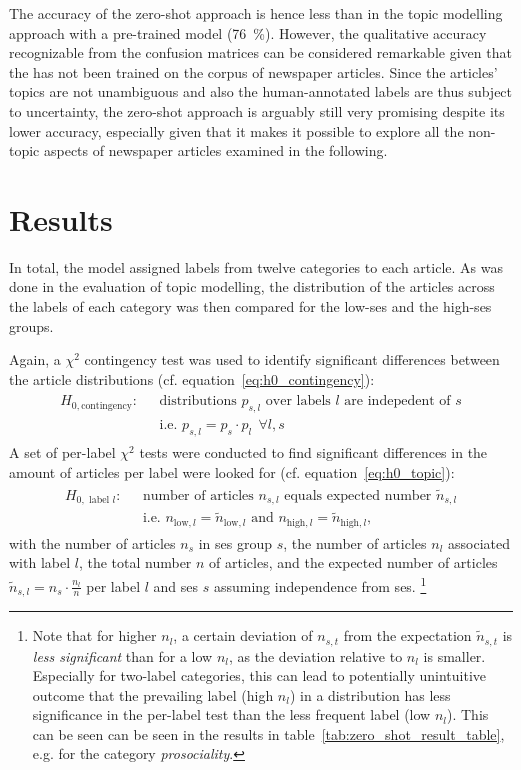 The accuracy of the zero-shot approach is hence less than in the topic modelling approach with a pre-trained model (\SI{76}{\percent}). However, the qualitative accuracy recognizable from the confusion matrices can be considered remarkable given that the has not been trained on the corpus of newspaper articles. Since the articles' topics are not unambiguous and also the human-annotated labels are thus subject to uncertainty, the zero-shot approach is arguably still very promising despite its lower accuracy, especially given that it makes it possible to explore all the non-topic aspects of newspaper articles examined in the following.


\section{Results}\label{ch:supervised_results}
In total, the model assigned labels from twelve categories to each article. As was done in the evaluation of topic modelling, the distribution of the articles across the labels of each category was then compared for the low-\gls{ses} and the high-\gls{ses} groups.

Again, a $\chi^2$ contingency test was used to identify significant differences between the article distributions (cf. equation~\ref{eq:h0_contingency}):
\begin{align}
    \begin{split}
        H_{0, \text{contingency}}: ~~~ &\text{distributions } p_{s, l} \text{ over labels } l \text{ are indepedent of } s\\
    & \text{i.e. } p_{s, l} = p_s \cdot p_l ~~ \forall l, s
    \end{split}
\end{align}
A set of per-label $\chi^2$ tests were conducted to find significant differences in the amount of articles per label were looked for (cf. equation~\ref{eq:h0_topic}):
\begin{align}
    \begin{split}
        H_{0, \text{ label }l}: ~~~ &\text{number of articles } n_{s, l} \text{ equals expected number } \tilde n_{s, l} \\
        & \text{i.e. } n_{\text{low}, l} = \tilde n_{\text{low}, l} \text{ and } n_{\text{high}, l} = \tilde n_{\text{high}, l},
    \end{split}
\end{align}
with the number of articles $n_s$ in \gls{ses} group $s$, the number of articles $n_l$ associated with label $l$, the total number $n$ of articles, and the expected number of articles $\tilde n_{s, l} = n_s \cdot \frac{n_l}{n}$ per label $l$ and \gls{ses} $s$ assuming independence from \gls{ses}. \footnote{Note that for higher $n_l$, a certain deviation of $n_{s, t}$ from the expectation $\tilde n_{s, t}$ is \textit{less significant} than for a low $n_l$, as the deviation relative to $n_l$ is smaller. Especially for two-label categories, this can lead to potentially unintuitive outcome that the prevailing label (high $n_l$) in a distribution has less significance in the per-label test than the less frequent label (low $n_l$). This can be seen can be seen in the results in table~\ref{tab:zero_shot_result_table}, e.g. for the category \textit{prosociality}.}

